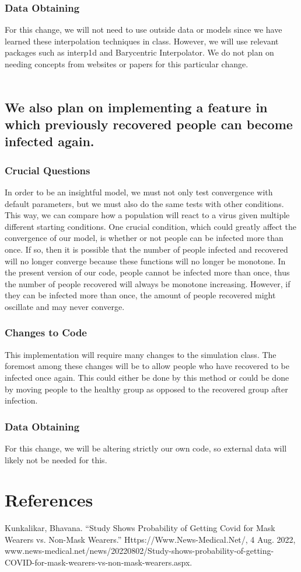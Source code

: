 \documentclass{article}
\begin{document}
\subsubsection{Data Obtaining} For this change, we will not need to use outside data or models since we have learned these interpolation techniques in class. However, we will use relevant packages such as interp1d and Barycentric Interpolator. We do not plan on needing concepts from websites or papers for this particular change. \\\\
\subsection{We also plan on implementing a feature in which previously recovered people can become infected again.}
\subsubsection{Crucial Questions} In order to be an insightful model, we must not only test convergence with default parameters, but we must also do the same tests with other conditions. This way, we can compare how a population will react to a virus given multiple different starting conditions. One crucial condition, which could greatly affect the convergence of our model, is whether or not people can be infected more than once. If so, then it is possible that the number of people infected and recovered will no longer converge because these functions will no longer be monotone. In the present version of our code, people cannot be infected more than once, thus the number of people recovered will always be monotone increasing. However, if they can be infected more than once, the amount of people recovered might oscillate and may never converge. \\
\subsubsection{Changes to Code} This implementation will require many changes to the simulation class. The foremost among these changes will be to allow people who have recovered to be infected once again. This could either be done by this method or could be done by moving people to the healthy group as opposed to the recovered group after infection. \\
\subsubsection{Data Obtaining} For this change, we will be altering strictly our own code, so external data will likely not be needed for this. \\

\section{References}
Kunkalikar, Bhavana. “Study Shows Probability of Getting Covid for Mask Wearers vs. Non-Mask Wearers.” Https://Www.News-Medical.Net/, 4 Aug. 2022, www.news-medical.net/news/20220802/Study-shows-probability-of-getting-COVID-for-mask-wearers-vs-non-mask-wearers.aspx.
\end{document}
